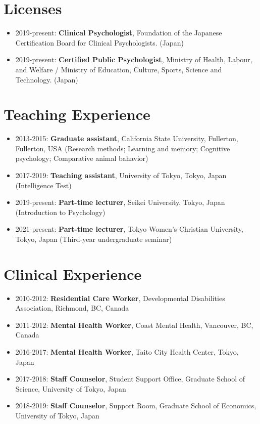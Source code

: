 \documentclass{article}
\begin{document}
\section{Licenses}
\begin{itemize}
	\item 2019-present: \textbf{Clinical Psychologist}, Foundation of the Japanese Certification Board for Clinical Psychologists. (Japan)
	\item 2019-present: \textbf{Certified Public Psychologist}, Ministry of Health, Labour, and Welfare / Ministry of Education, Culture, Sports, Science and Technology. (Japan)
\end{itemize} 

\section{Teaching Experience}
\begin{itemize}
	\item 2013-2015: \textbf{Graduate assistant}, California State University, Fullerton, Fullerton, USA (Research methods; Learning and memory; Cognitive psychology; Comparative animal bahavior)
	\item 2017-2019: \textbf{Teaching assistant}, University of Tokyo, Tokyo, Japan (Intelligence Test)
	\item 2019-present: \textbf{Part-time lecturer}, Seikei University, Tokyo, Japan (Introduction to Psychology)
	\item 2021-present: \textbf{Part-time lecturer}, Tokyo Women's Christian University, Tokyo, Japan (Third-year undergraduate seminar)
\end{itemize}

\section{Clinical Experience}
\begin{itemize}
	\item 2010-2012: \textbf{Residential Care Worker}, Developmental Disabilities Association, Richmond, BC, Canada
	\item 2011-2012: \textbf{Mental Health Worker}, Coast Mental Health, Vancouver, BC, Canada
	\item 2016-2017: \textbf{Mental Health Worker}, Taito City Health Center, Tokyo, Japan
	\item 2017-2018: \textbf{Staff Counselor}, Student Support Office, Graduate School of Science, University of Tokyo, Japan
	\item 2018-2019: \textbf{Staff Counselor}, Support Room, Graduate School of Economics, University of Tokyo, Japan
\end{itemize}
\end{document}
